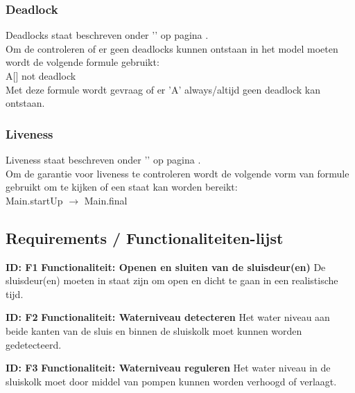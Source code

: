 \documentclass{article}
\begin{document}
\subsubsection{Deadlock}

Deadlocks staat beschreven onder '' op pagina \pageref{deadlock}.\\

\noindent Om de controleren of er geen deadlocks kunnen ontstaan in het model moeten wordt de volgende formule gebruikt: \\

A[] not deadlock \\
 
\noindent Met deze formule wordt gevraag of er 'A' always/altijd geen deadlock kan ontstaan.

\subsubsection{Liveness}

Liveness staat beschreven onder '' op pagina \pageref{liveness}.\\

\noindent Om de garantie voor liveness te controleren wordt de volgende vorm van formule gebruikt om te kijken of een staat kan worden bereikt: \\

Main.startUp $ \rightarrow $ Main.final


\subsection{Requirements / Functionaliteiten-lijst}\label{sec:FuncList}
\textbf{ID: F1} \newline
\textbf{Functionaliteit: Openen en sluiten van de sluisdeur(en)} \newline
De sluisdeur(en) moeten in staat zijn om open en dicht te gaan in een realistische tijd. \newline

\textbf{ID: F2} \newline
\textbf{Functionaliteit: Waterniveau detecteren} \newline
Het water niveau aan beide kanten van de sluis en binnen de sluiskolk moet kunnen worden gedetecteerd. \newline

\textbf{ID: F3} \newline
\textbf{Functionaliteit: Waterniveau reguleren} \newline
Het water niveau in de sluiskolk moet door middel van pompen kunnen worden verhoogd of verlaagt. \newline
\end{document}
